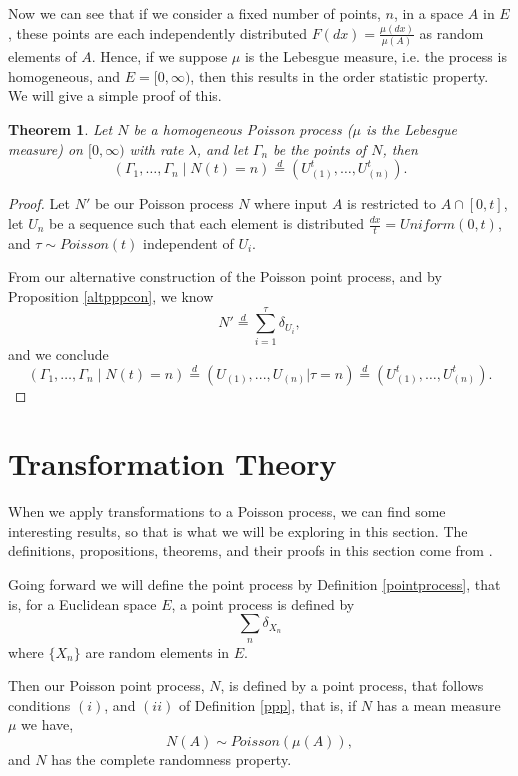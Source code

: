 \documentclass[11pt, oneside]{article}   	%
\newtheorem{theorem}{Theorem}[section]
\theoremstyle{definition}
\theoremstyle{remark}
\begin{document}
Now we can see that if we consider a fixed number of points, $n$, in a space $A$ in $E$, these points are each independently distributed $F(dx)=\frac{\mu(dx)}{\mu(A)}$ as random elements of $A$. Hence, if we suppose $\mu$ is the Lebesgue measure, i.e. the process is homogeneous, and $E=[0, \infty)$, then this results in the order statistic property. We will give a simple proof of this.

\begin{theorem} \label{thmosg}
  Let $N$ be a homogeneous Poisson process ($\mu$ is the Lebesgue measure) on $[0,\infty)$ with rate $\lambda$, and let ${\Gamma_n}$ be the points of $N$, then
$$(\Gamma_1,\dots,\Gamma_n \mid N(t)=n)\stackrel{d}{=}(U_{(1)}^t,\dots,U_{(n)}^t).$$
\end{theorem}

\begin{proof}
  Let $N'$ be our Poisson process $N$ where input $A$ is restricted to $A \cap [0,t]$, let ${U_n}$ be a sequence such that each element is distributed $\frac{dx}{t} = \textit{Uniform}(0,t)$, and $\tau \sim \textit{Poisson}(t)$ independent of ${U_i}$.

  From our alternative construction of the Poisson point process, and by Proposition \ref{altpppcon}, we know
  $$N' \stackrel{d}{=} \sum_{i=1}^\tau \delta_{U_i},$$
  and we conclude
  $$(\Gamma_1,\dots,\Gamma_n \mid N(t)=n)\stackrel{d}{=}(U_{(1)},...,U_{(n)}| \tau = n) \stackrel{d}{=}(U_{(1)}^t,\dots,U_{(n)}^t).$$
\end{proof}


\newpage
\section{Transformation Theory}
When we apply transformations to a Poisson process, we can find some interesting results, so that is what we will be exploring in this section. The definitions, propositions, theorems, and their proofs in this section come from \cite{resnick2005}.

Going forward we will define the point process by Definition \ref{pointprocess}, that is, for a Euclidean space $E$, a point process is defined by $$\sum_{n} \delta_{X_n}$$
where $\{X_n\}$ are random elements in $E$.

Then our Poisson point process, $N$, is defined by a point process, that follows conditions $(i)$, and $(ii)$ of Definition \ref{ppp}, that is, if $N$ has a mean measure $\mu$ we have, $$N(A) \sim \textit{Poisson}(\mu(A)),$$ and $N$ has the complete randomness property.
\end{document}
